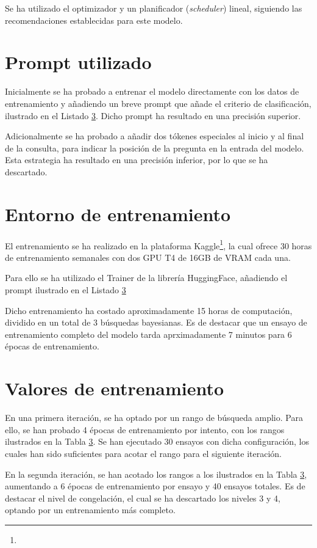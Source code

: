 Se ha utilizado el optimizador  y un planificador (\textit{scheduler}) lineal, siguiendo las recomendaciones establecidas para este modelo.

\section{Prompt utilizado}
Inicialmente se ha probado a entrenar el modelo directamente con los datos de entrenamiento y añadiendo un breve prompt que añade el criterio de clasificación, ilustrado en el Listado \ref{}. Dicho prompt ha resultado en una precisión superior.  

Adicionalmente se ha probado a añadir dos tókenes especiales al inicio y al final de la consulta, para indicar la posición de la pregunta en la entrada del modelo. Esta estrategia ha resultado en una precisión inferior, por lo que se ha descartado. 

\section{Entorno de entrenamiento}
El entrenamiento se ha realizado en la plataforma Kaggle\footnote{}, la cual ofrece 30 horas de entrenamiento semanales con dos GPU T4 de 16GB de VRAM cada una.

Para ello se ha utilizado el Trainer de la librería HuggingFace, añadiendo el prompt ilustrado en el Listado \ref{}  

Dicho entrenamiento ha costado aproximadamente 15 horas de computación, dividido en un total de 3 búsquedas bayesianas. Es de destacar que un ensayo de entrenamiento completo del modelo tarda aprximadamente 7 minutos para 6 épocas de entrenamiento. 

\section{Valores de entrenamiento}
En una primera iteración, se ha optado por un rango de búsqueda amplio. Para ello, se han probado 4 épocas de entrenamiento por intento, con los rangos ilustrados en la Tabla \ref{}. Se han ejecutado 30 ensayos con dicha configuración, los cuales han sido suficientes para acotar el rango para el siguiente iteración. 

En la segunda iteración, se han acotado los rangos a los ilustrados en la Tabla \ref{}, aumentando a 6 épocas de entrenamiento por ensayo y 40 ensayos totales. Es de destacar el nivel de congelación, el cual se ha descartado los niveles 3 y 4, optando por un entrenamiento más completo. 

